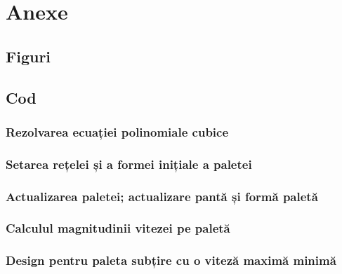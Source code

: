 \appendix

\chapter{Anexe}

\section{Figuri}

\clearpage


\section{Cod}

\subsection{Rezolvarea ecuației polinomiale cubice}



\clearpage


\subsection{Setarea rețelei și a formei inițiale a paletei}



\clearpage


\subsection{Actualizarea paletei; actualizare pantă și formă paletă}



\clearpage


\subsection{Calculul magnitudinii vitezei pe paletă}



\clearpage


\begin{comment}
\subsection{Subrutina de calcula a valorii minime a unei funcții cu variabile multiple}



\clearpage
\end{comment}


\subsection{Design pentru paleta subțire cu o viteză maximă minimă}



\clearpage